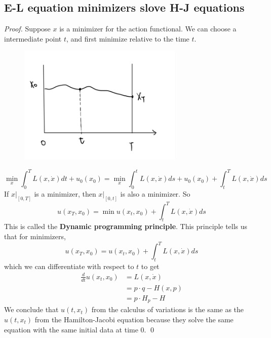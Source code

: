 \subsection{E-L equation minimizers slove H-J equations}
\vspace{1em}
\begin{proof}
    Suppose $x$ is a minimizer for the action functional. We can choose a intermediate
point $t$, and first minimize relative to the time $t$.

\begin{figure}[H]
    \centering
    \includegraphics[width=0.7\textwidth]{pics/9-3.png}
\end{figure}

\[
    \min _{x} \int_{0}^{T} L(x, \dot{x}) d t+u_{0}\left(x_{0}\right)=\min _{x} \int_{0}^{t} L(x, \dot{x}) d s+u_{0}\left(x_{0}\right)+\int_{t}^{T} L(x, \dot x) d s
\]
If $\left.x\right|_{[0, T]}$ is a minimizer, then $\left.x\right|_{[0, t]}$ is also a minimizer. So
$$
u\left(x_{T}, x_{0}\right)=\min u\left(x_{t}, x_{0}\right)+\int_{t}^{T} L(x, \dot{x}) d s
$$
This is called the \textbf{Dynamic programming principle}. This principle tells us that for minimizers, 
\[
    u\left(x_{T}, x_{0}\right)=u\left(x_{t}, x_{0}\right)+\int_{t}^{T} L(x, \dot{x}) d s
\]
which we can differentiate with respect to $t$ to get
$$
\begin{aligned}
\frac{d}{d t} u\left(x_{t}, x_{0}\right) &=L(x, \dot{x}) \\
&=p \cdot q-H(x, p) \\
&=p \cdot H_{p}-H
\end{aligned}
$$
We conclude that $u\left(t, x_{t}\right)$ from the calculus of variations is the same as the $u\left(t, x_{t}\right)$ from the Hamilton-Jacobi equation because they solve the same equation with the same initial data at time $0 .$ \qed 
\end{proof}


